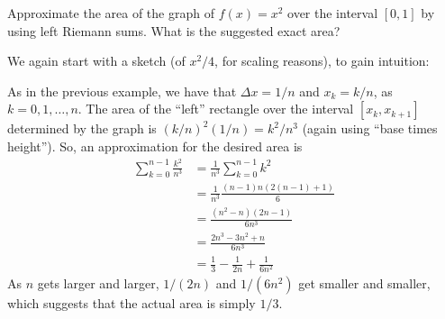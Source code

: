 \documentclass[nooutcomes]{ximera}
\begin{document}
\begin{example}
  Approximate the area of the graph of $f(x) = x^2$ over the interval $[0,1]$ by using left Riemann sums. What is the suggested exact area?

  \begin{explanation}
    We again start with a sketch (of $x^2/4$, for scaling reasons), to gain intuition:

    \begin{image}
\end{image}


    As in the previous example, we have that $\Delta x = 1/n$ and $x_k = k/n$, as $k=0,1,\ldots, n$. The area of the ``left'' rectangle over the interval $[x_k,x_{k+1}]$ determined by the graph is $(k/n)^2(1/n) = k^2/n^3$ (again using ``base times height''). So, an approximation for the desired area is
    \begin{align*}
      \sum_{k=0}^{n-1}\frac{k^2}{n^3} &= \frac{1}{n^3}\sum_{k=0}^{n-1} k^2 \\ &= \frac{1}{n^3} \frac{(n-1)n(2(n-1)+1)}{6} \\ &= \frac{(n^2-n)(2n-1)}{6n^3} \\ &= \frac{2n^3 - 3n^2+n}{6n^3} \\ &= \frac{1}{3} -\frac{1}{2n} + \frac{1}{6n^2}
    \end{align*}
As $n$ gets larger and larger, $1/(2n)$ and $1/(6n^2)$ get smaller and smaller, which suggests that the actual area is simply $1/3$.
  \end{explanation}
\end{example}
\end{document}
